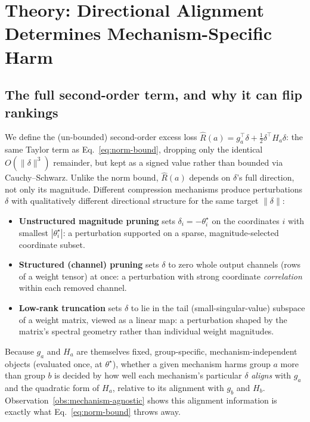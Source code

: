 \documentclass{article}
\newcommand{\theorig}{\theta^\star}
\begin{document}
\section{Theory: Directional Alignment Determines Mechanism-Specific Harm}
\label{sec:theory}

\subsection{The full second-order term, and why it can flip rankings}

We define the (un-bounded) second-order excess loss $\widehat{R}(a) = g_a^\top \delta + \tfrac12 \delta^\top H_a \delta$: the same Taylor term as Eq.~\eqref{eq:norm-bound}, dropping only the identical $O(\|\delta\|^3)$ remainder, but kept as a signed value rather than bounded via Cauchy--Schwarz. Unlike the norm bound, $\widehat{R}(a)$ depends on $\delta$'s full direction, not only its magnitude. Different compression mechanisms produce perturbations $\delta$ with qualitatively different directional structure for the same target $\|\delta\|$:
\begin{itemize}
  \item \textbf{Unstructured magnitude pruning} sets $\delta_i = -\theorig_i$ on the coordinates $i$ with smallest $|\theorig_i|$: a perturbation supported on a sparse, magnitude-selected coordinate subset.
  \item \textbf{Structured (channel) pruning} sets $\delta$ to zero whole output channels (rows of a weight tensor) at once: a perturbation with strong coordinate \emph{correlation} within each removed channel.
  \item \textbf{Low-rank truncation} sets $\delta$ to lie in the tail (small-singular-value) subspace of a weight matrix, viewed as a linear map: a perturbation shaped by the matrix's spectral geometry rather than individual weight magnitudes.
\end{itemize}
Because $g_a$ and $H_a$ are themselves fixed, group-specific, mechanism-independent objects (evaluated once, at $\theorig$), whether a given mechanism harms group $a$ more than group $b$ is decided by how well each mechanism's particular $\delta$ \emph{aligns} with $g_a$ and the quadratic form of $H_a$, relative to its alignment with $g_b$ and $H_b$. Observation~\ref{obs:mechanism-agnostic} shows this alignment information is exactly what Eq.~\eqref{eq:norm-bound} throws away.
\end{document}
